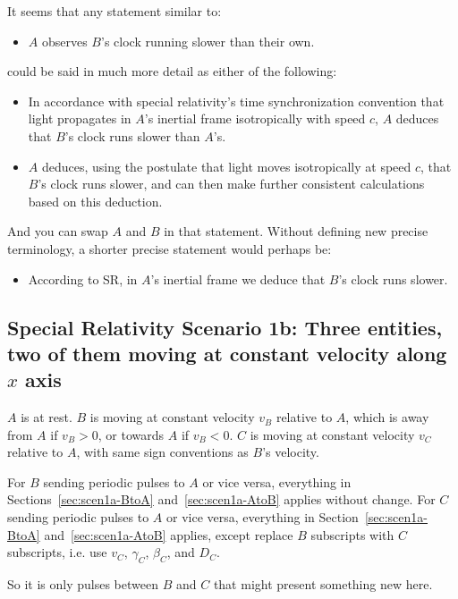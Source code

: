 \documentclass[a4paper]{article}
\theoremstyle{plain}
\theoremstyle{definition}
\begin{document}
It seems that any statement similar to:
\begin{itemize}
\item $A$ observes $B$'s clock running slower than their own.
\end{itemize}
could be said in much more detail as either of the following:
\begin{itemize}
\item In accordance with special relativity's time synchronization
  convention that light propagates in $A$'s inertial frame
  isotropically with speed $c$, $A$ deduces that $B$'s clock runs
  slower than $A$'s.
\item $A$ deduces, using the postulate that light moves isotropically
  at speed $c$, that $B$’s clock runs slower, and can then make
  further consistent calculations based on this deduction.
\end{itemize}
And you can swap $A$ and $B$ in that statement.  Without defining new
precise terminology, a shorter precise statement would perhaps be:
\begin{itemize}
\item According to SR, in $A$'s inertial frame we deduce that $B$'s
  clock runs slower.
\end{itemize}


\subsection{Special Relativity Scenario 1b: Three entities, two of them moving at constant velocity along $x$ axis}
\label{sec:scen1b}

$A$ is at rest.
$B$ is moving at constant velocity $v_B$ relative to $A$,
which is away from $A$ if $v_B > 0$, or towards $A$ if $v_B < 0$.
$C$ is moving at constant velocity $v_C$ relative to $A$,
with same sign conventions as $B$'s velocity.

For $B$ sending periodic pulses to $A$ or vice versa, everything in
Sections~\ref{sec:scen1a-BtoA} and~\ref{sec:scen1a-AtoB} applies without
change.
For $C$ sending periodic pulses to $A$ or vice versa, everything in
Section~\ref{sec:scen1a-BtoA} and~\ref{sec:scen1a-AtoB} applies,
except replace $B$ subscripts
with $C$ subscripts, i.e. use $v_C$, $\gamma_C$, $\beta_C$, and $D_C$.

So it is only pulses between $B$ and $C$ that might present something
new here.
\end{document}
